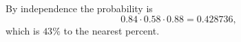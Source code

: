 By independence the probability is
\[0.84\cdot0.58\cdot0.88=0.428736,\]
which is $\boxed{43\%}$ to the nearest percent.
